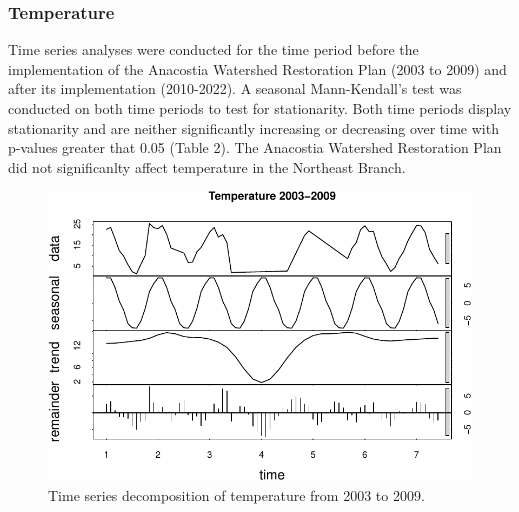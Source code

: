 \documentclass[
  12pt,
]{article}
\begin{document}
\newpage

\hypertarget{temperature}{%
\subsubsection{Temperature}\label{temperature}}

Time series analyses were conducted for the time period before the
implementation of the Anacostia Watershed Restoration Plan (2003 to
2009) and after its implementation (2010-2022). A seasonal
Mann-Kendall's test was conducted on both time periods to test for
stationarity. Both time periods display stationarity and are neither
significantly increasing or decreasing over time with p-values greater
that 0.05 (Table 2). The Anacostia Watershed Restoration Plan did not
significanlty affect temperature in the Northeast Branch.

\newpage

\begin{figure}

{\centering \includegraphics{Project_Template_files/figure-latex/Plot of Early Temperature Time Series Decomposition-1} 

}

\caption{Time series decomposition of temperature from 2003 to 2009.}\label{fig:Plot of Early Temperature Time Series Decomposition}
\end{figure}
\end{document}
